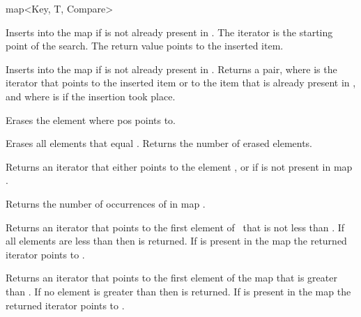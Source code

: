 \begin{ccClassTemplate} {map<Key, T, Compare>}

{Inserts  into the map if  is not already
 present in \ccVar. The iterator  is the starting point of
 the search.  The return value points to the inserted item.}

{Inserts  into the map if  is not already
 present in \ccVar. Returns a pair, where 
 is the iterator that points to the inserted item or to the
 item that is already present in \ccVar, and where 
 is  if the insertion took place.}

{Erases the element where pos points to.}

{Erases all elements that equal . Returns the number
 of erased elements.}


{Returns an iterator that either points to the element ,
 or  if  is not present in map \ccVar.}

{Returns the number of occurrences of  in map \ccVar.}


{Returns an iterator that points to the first element of \ccVar\ 
that is not less than . If all elements are less than
 then \ccStyle{end()} is returned. If 
is present in the map the returned iterator points to \ccStyle{k}.}

{Returns an iterator that points to the first element of the map
that is greater than . If no element is greater than
 then  is returned. If 
is present in the map the returned iterator points to \ccStyle{k}.}

\end{ccClassTemplate} 
